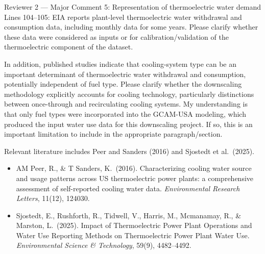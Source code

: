 \documentclass[11pt,letterpaper]{article}
\begin{document}
\begin{commentbox}[label={r2:maj5}]{Reviewer 2 --- Major Comment 5: Representation of thermoelectric water demand}
Lines 104--105: EIA reports plant-level thermoelectric water withdrawal and consumption data, including monthly data for some years. Please clarify whether these data were considered as inputs or for calibration/validation of the thermoelectric component of the dataset.

In addition, published studies indicate that cooling-system type can be an important determinant of thermoelectric water withdrawal and consumption, potentially independent of fuel type. Please clarify whether the downscaling methodology explicitly accounts for cooling technology, particularly distinctions between once-through and recirculating cooling systems. My understanding is that only fuel types were incorporated into the GCAM-USA modeling, which produced the input water use data for this downscaling project. If so, this is an important limitation to include in the appropriate paragraph/section.

Relevant literature includes Peer and Sanders (2016) and Sjostedt et al.\ (2025).
\begin{itemize}[leftmargin=1.5em, topsep=3pt, itemsep=3pt]
  \item AM Peer, R., \& T Sanders, K.\ (2016). Characterizing cooling water source and usage patterns across US thermoelectric power plants: a comprehensive assessment of self-reported cooling water data. \textit{Environmental Research Letters}, 11(12), 124030.
  \item Sjostedt, E., Rushforth, R., Tidwell, V., Harris, M., Mcmanamay, R., \& Marston, L.\ (2025). Impact of Thermoelectric Power Plant Operations and Water Use Reporting Methods on Thermoelectric Power Plant Water Use. \textit{Environmental Science \& Technology}, 59(9), 4482--4492.
\end{itemize}
\end{commentbox}
\end{document}
